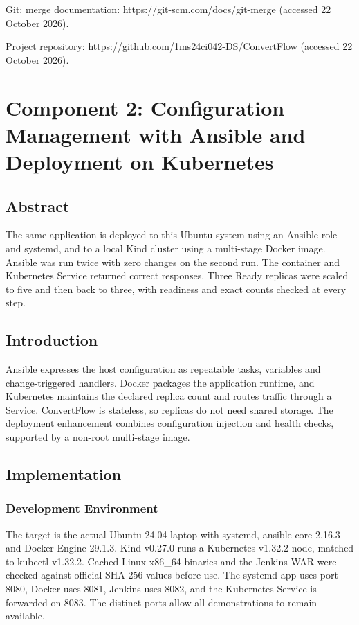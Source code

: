 \documentclass[12pt,a4paper]{article}
\begin{document}
Git: merge documentation: https://git-scm.com/docs/git-merge (accessed 22 October 2026).

Project repository: https://github.com/1ms24ci042-DS/ConvertFlow (accessed 22 October 2026).

\newpage
\section*{Component 2: Configuration Management with Ansible and Deployment on Kubernetes}
\subsection*{Abstract}
The same application is deployed to this Ubuntu system using an Ansible role and systemd, and to a local Kind cluster using a multi-stage Docker image. Ansible was run twice with zero changes on the second run. The container and Kubernetes Service returned correct responses. Three Ready replicas were scaled to five and then back to three, with readiness and exact counts checked at every step.

\subsection*{Introduction}
Ansible expresses the host configuration as repeatable tasks, variables and change-triggered handlers. Docker packages the application runtime, and Kubernetes maintains the declared replica count and routes traffic through a Service. ConvertFlow is stateless, so replicas do not need shared storage. The deployment enhancement combines configuration injection and health checks, supported by a non-root multi-stage image.

\subsection*{Implementation}
\subsubsection*{Development Environment}
The target is the actual Ubuntu 24.04 laptop with systemd, ansible-core 2.16.3 and Docker Engine 29.1.3. Kind v0.27.0 runs a Kubernetes v1.32.2 node, matched to kubectl v1.32.2. Cached Linux x86\_64 binaries and the Jenkins WAR were checked against official SHA-256 values before use. The systemd app uses port 8080, Docker uses 8081, Jenkins uses 8082, and the Kubernetes Service is forwarded on 8083. The distinct ports allow all demonstrations to remain available.
\end{document}
